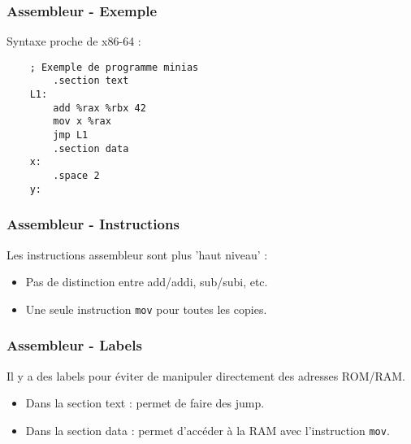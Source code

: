 \documentclass[xcolor=pst,10pt,onlymath]{beamer}
\begin{document}
\begin{frame}[fragile]
    \frametitle{Assembleur - Exemple}
    Syntaxe proche de x86-64 :
    \begin{center}
    \begin{lstlisting}
    ; Exemple de programme minias
        .section text
    L1:
        add %rax %rbx 42
        mov x %rax
        jmp L1
        .section data
    x:  
        .space 2
    y:
    \end{lstlisting}
    \end{center}
\end{frame}

\begin{frame}
    \frametitle{Assembleur - Instructions}
    Les instructions assembleur sont plus 'haut niveau' :
    \begin{itemize}
        \item Pas de distinction entre add/addi, sub/subi, etc.
        \item Une seule instruction \texttt{mov} pour toutes les copies.
    \end{itemize}
\end{frame}

\begin{frame}
    \frametitle{Assembleur - Labels}
    Il y a des labels pour éviter de manipuler directement des adresses ROM/RAM.
    \begin{itemize}
        \item Dans la section text : permet de faire des jump.
        \item Dans la section data : permet d'accéder à la RAM avec l'instruction \texttt{mov}.
    \end{itemize}
\end{frame}
\end{document}
